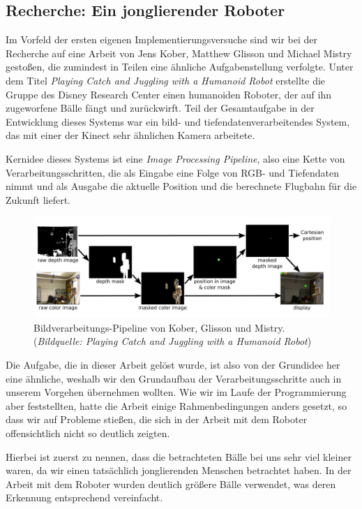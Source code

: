 \documentclass[12pt,a4paper,ngerman]{scrartcl}
\begin{document}
\subsection{Recherche: Ein jonglierender Roboter}

Im Vorfeld der ersten eigenen Implementierungsversuche sind wir bei der
Recherche auf eine Arbeit von Jens Kober, Matthew Glisson und Michael Mistry
gestoßen, die zumindest in Teilen eine ähnliche Aufgabenstellung verfolgte.
Unter dem Titel {\em Playing Catch and Juggling with a Humanoid Robot}\cite{kober}
erstellte die Gruppe des Disney Research Center\cite{disneyresearch} einen
humanoiden Roboter, der auf ihn zugeworfene Bälle fängt und zurückwirft.
Teil der Gesamtaufgabe in der Entwicklung dieses Systems war ein
bild- und tiefendatenverarbeitendes System, das mit einer der Kinect sehr ähnlichen
Kamera arbeitete.

Kernidee dieses Systems ist eine \textit{Image Processing Pipeline}, also eine
Kette von Verarbeitungsschritten, die als Eingabe eine Folge von RGB- und Tiefendaten
nimmt und als Ausgabe die aktuelle Position und die berechnete Flugbahn für die Zukunft liefert.

\begin{figure}[H]
    \centering
    \includegraphics[scale=0.31]{img/koberpipeline.jpg}
    \caption{Bildverarbeitungs-Pipeline von Kober, Glisson und Mistry. ({\em Bildquelle: Playing Catch and Juggling with a Humanoid Robot\cite{kober}})}
    \label{koberpipeline}
\end{figure}

Die Aufgabe, die in dieser Arbeit gelöst wurde, ist also von der Grundidee her eine
ähnliche, weshalb wir den Grundaufbau der Verarbeitungsschritte auch in unserem
Vorgehen übernehmen wollten. Wie wir im Laufe der Programmierung aber feststellten,
hatte die Arbeit einige Rahmenbedingungen anders gesetzt, so dass wir auf Probleme
stießen, die sich in der Arbeit mit dem Roboter offensichtlich nicht so deutlich
zeigten.

Hierbei ist zuerst zu nennen, dass die betrachteten Bälle bei uns sehr viel kleiner
waren, da wir einen tatsächlich jonglierenden Menschen betrachtet haben. In der
Arbeit mit dem Roboter wurden deutlich größere Bälle verwendet, was deren Erkennung
entsprechend vereinfacht.
\end{document}
